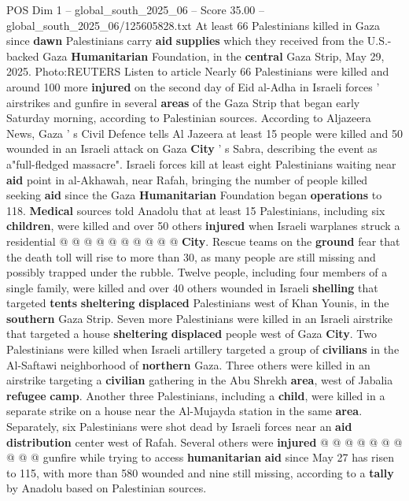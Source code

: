 \begin{textsample}{POS Dim 1 – global\_south\_2025\_06 – Score 35.00 – global\_south\_2025\_06/125605828.txt}  \label{ex:f1_pos_133}
At least 66 Palestinians killed in Gaza since \textbf{dawn} Palestinians carry \textbf{aid} \textbf{supplies} which they received from the U.S.-backed Gaza \textbf{Humanitarian} Foundation, in the \textbf{central} Gaza Strip, May 29, 2025.
Photo:REUTERS Listen to article Nearly 66 Palestinians were killed and around 100 more \textbf{injured} on the second day of Eid al-Adha in Israeli forces ' airstrikes and gunfire in several \textbf{areas} of the Gaza Strip that began early Saturday morning, according to Palestinian sources.
According to Aljazeera News, Gaza ' s Civil Defence tells Al Jazeera at least 15 people were killed and 50 wounded in an Israeli attack on Gaza \textbf{City} ' s Sabra, describing the event as a"full-fledged massacre".
Israeli forces kill at least eight Palestinians waiting near \textbf{aid} point in al-Akhawah, near Rafah, bringing the number of people killed seeking \textbf{aid} since the Gaza \textbf{Humanitarian} Foundation began \textbf{operations} to 118. \textbf{Medical} sources told Anadolu that at least 15 Palestinians, including six \textbf{children}, were killed and over 50 others \textbf{injured} when Israeli warplanes struck a residential @ @ @ @ @ @ @ @ @ @ \textbf{City}.
Rescue teams on the \textbf{ground} fear that the death toll will rise to more than 30, as many people are still missing and possibly trapped under the rubble.
Twelve people, including four members of a single family, were killed and over 40 others wounded in Israeli \textbf{shelling} that targeted \textbf{tents} \textbf{sheltering} \textbf{displaced} Palestinians west of Khan Younis, in the \textbf{southern} Gaza Strip.
Seven more Palestinians were killed in an Israeli airstrike that targeted a house \textbf{sheltering} \textbf{displaced} people west of Gaza \textbf{City}.
Two Palestinians were killed when Israeli artillery targeted a group of \textbf{civilians} in the Al-Saftawi neighborhood of \textbf{northern} Gaza.
Three others were killed in an airstrike targeting a \textbf{civilian} gathering in the Abu Shrekh \textbf{area}, west of Jabalia \textbf{refugee} \textbf{camp}.
Another three Palestinians, including a \textbf{child}, were killed in a separate strike on a house near the Al-Mujayda station in the same \textbf{area}.
Separately, six Palestinians were shot dead by Israeli forces near an \textbf{aid} \textbf{distribution} center west of Rafah.
Several others were \textbf{injured} @ @ @ @ @ @ @ @ @ @ gunfire while trying to access \textbf{humanitarian} \textbf{aid} since May 27 has risen to 115, with more than 580 wounded and nine still missing, according to a \textbf{tally} by Anadolu based on Palestinian sources.

\end{textsample}

